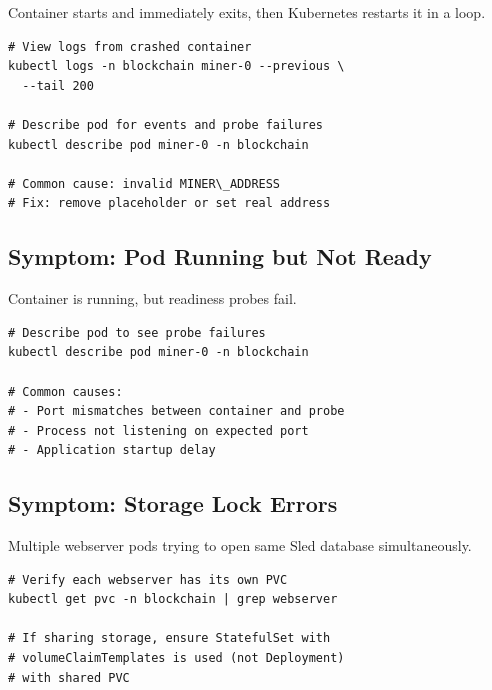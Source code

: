 Container starts and immediately exits, then Kubernetes restarts it in a loop.

\begin{listing}[htbp]
\caption{Debug CrashLoopBackOff}
\label{lst:ch23-crashloop}
\begin{verbatim}
# View logs from crashed container
kubectl logs -n blockchain miner-0 --previous \
  --tail 200

# Describe pod for events and probe failures
kubectl describe pod miner-0 -n blockchain

# Common cause: invalid MINER\_ADDRESS
# Fix: remove placeholder or set real address
\end{verbatim}
\end{listing}

\subsection{Symptom: Pod Running but Not Ready}

Container is running, but readiness probes fail.

\begin{listing}[htbp]
\caption{Debug Readiness Issues}
\label{lst:ch23-not-ready}
\begin{verbatim}
# Describe pod to see probe failures
kubectl describe pod miner-0 -n blockchain

# Common causes:
# - Port mismatches between container and probe
# - Process not listening on expected port
# - Application startup delay
\end{verbatim}
\end{listing}

\subsection{Symptom: Storage Lock Errors}

Multiple webserver pods trying to open same Sled database simultaneously.

\begin{listing}[htbp]
\caption{Debug Storage Lock Errors}
\label{lst:ch23-storage-lock}
\begin{verbatim}
# Verify each webserver has its own PVC
kubectl get pvc -n blockchain | grep webserver

# If sharing storage, ensure StatefulSet with
# volumeClaimTemplates is used (not Deployment)
# with shared PVC
\end{verbatim}
\end{listing}

